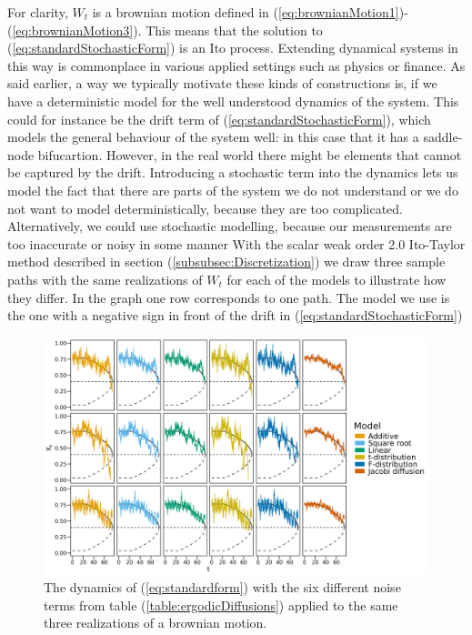 For clarity, $W_t$ is a brownian motion defined in (\ref{eq:brownianMotion1})-(\ref{eq:brownianMotion3}). This means that the solution to (\ref{eq:standardStochasticForm}) is an Ito process. Extending dynamical systems in this way is commonplace in various applied settings such as physics or finance. As said earlier, a way we typically motivate these kinds of constructions is, if we have a deterministic model for the well understood dynamics of the system. This could for instance be the drift term of (\ref{eq:standardStochasticForm}), which models the general behaviour of the system well: in this case that it has a saddle-node bifucartion. However, in the real world there might be elements that cannot be captured by the drift. Introducing a stochastic term into the dynamics lets us model the fact that there are parts of the system we do not understand or we do not want to model deterministically, because they are too complicated. Alternatively, we could use stochastic modelling, because our measurements are too inaccurate or noisy in some manner \newpage
\noindent With the scalar weak order 2.0 Ito-Taylor method described in section (\ref{subsubsec:Discretization}) we draw three sample paths with the same realizations of $W_t$ for each of the models to illustrate how they differ. In the graph one row corresponds to one path. The model we use is the one with a negative sign in front of the drift in (\ref{eq:standardStochasticForm})
\begin{figure}[h]
    \begin{center}
        \includegraphics[scale = .1]{figures/sample_paths_plot_small_scale.jpeg}
        \caption{The dynamics of (\ref{eq:standardform}) with the six different noise terms from table (\ref{table:ergodicDiffusions}) applied to the same three realizations of a brownian motion.}
        \label{figure:samplesFromAllDifferentModels}
    \end{center}
\end{figure}\\
